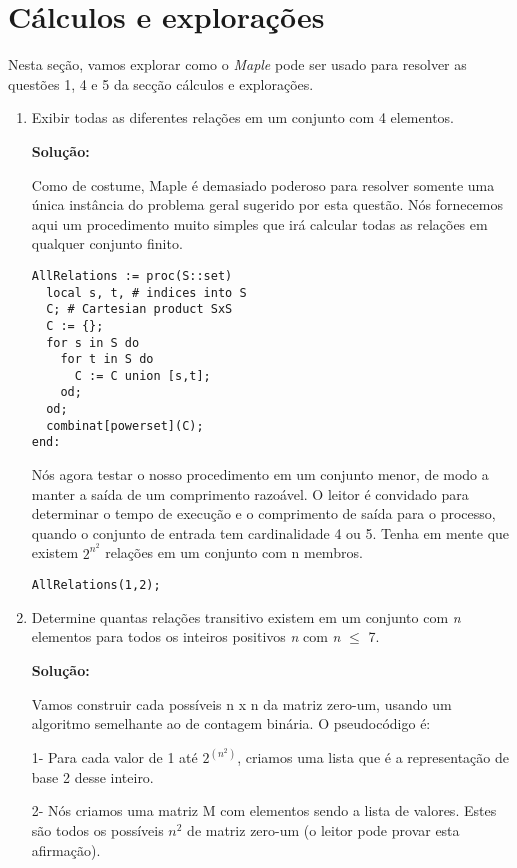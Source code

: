 \documentclass[a4paper]{article}
\begin{document}
\section{Cálculos e explorações}
Nesta seção, vamos explorar como o \textit{Maple} pode ser usado para resolver as questões 1, 4 e 5 da secção cálculos e explorações.

\begin{enumerate}
\item{Exibir todas as diferentes relações em um conjunto com 4 elementos.}

	\textbf{Solução:}
    
    	Como de costume, Maple é demasiado poderoso para resolver somente uma única instância do problema geral sugerido por esta questão. Nós fornecemos aqui um procedimento muito simples que irá calcular todas as relações em qualquer conjunto finito.
        
\begin{lstlisting}
AllRelations := proc(S::set)
  local s, t, # indices into S
  C; # Cartesian product SxS
  C := {};
  for s in S do
    for t in S do
      C := C union [s,t];
    od;
  od;
  combinat[powerset](C);
end:
\end{lstlisting}

		Nós agora testar o nosso procedimento em um conjunto menor, de modo a manter a saída de um comprimento razoável. O leitor é convidado para determinar o tempo de execução e o comprimento de saída para o processo, quando o conjunto de entrada tem cardinalidade 4 ou 5. Tenha em mente que existem $2^{n^{2}}$ relações em um conjunto com n membros.

\begin{lstlisting}
AllRelations(1,2);
\end{lstlisting}

\item{Determine quantas relações transitivo existem em um conjunto com \textit{n} elementos para todos os inteiros positivos \textit{n} com \textit{n} $\le$ 7.}

	\textbf{Solução:}
    
    	Vamos construir cada possíveis n x n da matriz zero-um, usando um algoritmo semelhante ao de contagem binária. O pseudocódigo é:
        
        1- Para cada valor de 1 até $2^{(n ^{2})}$, criamos uma lista que é a representação de base 2 desse inteiro.
        
        2- Nós criamos uma matriz M com elementos sendo a lista de valores. Estes são todos os possíveis $n^{2}$ de matriz zero-um (o leitor pode provar esta afirmação).
        

\end{enumerate}
\end{document}
